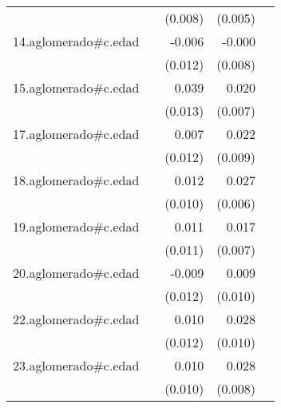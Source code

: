 {\begin{longtable}{l*{4}{D{.}{.}{-1}}}
            &                     &     (0.008)         &     (0.005)         &                     \\
\addlinespace
14.aglomerado#c.edad&                     &      -0.006         &      -0.000         &                     \\
            &                     &     (0.012)         &     (0.008)         &                     \\
\addlinespace
15.aglomerado#c.edad&                     &       0.039\sym{**} &       0.020\sym{**} &                     \\
            &                     &     (0.013)         &     (0.007)         &                     \\
\addlinespace
17.aglomerado#c.edad&                     &       0.007         &       0.022\sym{*}  &                     \\
            &                     &     (0.012)         &     (0.009)         &                     \\
\addlinespace
18.aglomerado#c.edad&                     &       0.012         &       0.027\sym{***}&                     \\
            &                     &     (0.010)         &     (0.006)         &                     \\
\addlinespace
19.aglomerado#c.edad&                     &       0.011         &       0.017\sym{*}  &                     \\
            &                     &     (0.011)         &     (0.007)         &                     \\
\addlinespace
20.aglomerado#c.edad&                     &      -0.009         &       0.009         &                     \\
            &                     &     (0.012)         &     (0.010)         &                     \\
\addlinespace
22.aglomerado#c.edad&                     &       0.010         &       0.028\sym{**} &                     \\
            &                     &     (0.012)         &     (0.010)         &                     \\
\addlinespace
23.aglomerado#c.edad&                     &       0.010         &       0.028\sym{***}&                     \\
            &                     &     (0.010)         &     (0.008)         &                     \\

\end{longtable}}
